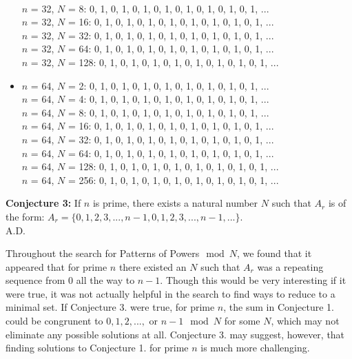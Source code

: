 \documentclass{article}
\begin{document}
\begin{flushleft}
\begin{itemize}
            \\ $n$ = 32, $N$ = 8:  0, 1, 0, 1, 0, 1, 0, 1, 0, 1, 0, 1, 0, 1, 0, 1, ...
            \\ $n$ = 32, $N$ = 16:  0, 1, 0, 1, 0, 1, 0, 1, 0, 1, 0, 1, 0, 1, 0, 1, ...
            \\ $n$ = 32, $N$ = 32:  0, 1, 0, 1, 0, 1, 0, 1, 0, 1, 0, 1, 0, 1, 0, 1, ...
            \\ $n$ = 32, $N$ = 64:  0, 1, 0, 1, 0, 1, 0, 1, 0, 1, 0, 1, 0, 1, 0, 1, ...
            \\ $n$ = 32, $N$ = 128:  0, 1, 0, 1, 0, 1, 0, 1, 0, 1, 0, 1, 0, 1, 0, 1, ...
        \item $n$ = 64, $N$ = 2:  0, 1, 0, 1, 0, 1, 0, 1, 0, 1, 0, 1, 0, 1, 0, 1, ...
            \\ $n$ = 64, $N$ = 4:  0, 1, 0, 1, 0, 1, 0, 1, 0, 1, 0, 1, 0, 1, 0, 1, ...
            \\ $n$ = 64, $N$ = 8:  0, 1, 0, 1, 0, 1, 0, 1, 0, 1, 0, 1, 0, 1, 0, 1, ...
            \\ $n$ = 64, $N$ = 16:  0, 1, 0, 1, 0, 1, 0, 1, 0, 1, 0, 1, 0, 1, 0, 1, ...
            \\ $n$ = 64, $N$ = 32:  0, 1, 0, 1, 0, 1, 0, 1, 0, 1, 0, 1, 0, 1, 0, 1, ...
            \\ $n$ = 64, $N$ = 64:  0, 1, 0, 1, 0, 1, 0, 1, 0, 1, 0, 1, 0, 1, 0, 1, ...
            \\ $n$ = 64, $N$ = 128:  0, 1, 0, 1, 0, 1, 0, 1, 0, 1, 0, 1, 0, 1, 0, 1, ...
            \\ $n$ = 64, $N$ = 256:  0, 1, 0, 1, 0, 1, 0, 1, 0, 1, 0, 1, 0, 1, 0, 1, ...
    \end{itemize}

\vspace{.1in}

{\bf Conjecture 3:} If $n$ is prime, there exists a natural number $N$ such that $A_r$ is of the form: $A_r=\{0,1,2,3,...,n-1,0,1,2,3,...,n-1,...\}$. \\
        \hspace{4.3in} A.D.

    Throughout the search for Patterns of Powers$\mod N$, we found that it appeared that for prime $n$ there existed an $N$ such that $A_r$ was a repeating sequence from $0$ all the way to $n-1$. Though this would be very interesting if it were true, it was not actually helpful in the search to find ways to reduce to a minimal set. If Conjecture 3. were true, for prime $n$, the sum in Conjecture 1. could be congrunent to $0,1,2,...,$ or $n-1\mod N$ for some $N$, which may not eliminate any possible solutions at all. Conjecture 3. may suggest, however, that finding solutions to Conjecture 1. for prime $n$ is much more challenging.


\end{flushleft}
\end{document}
